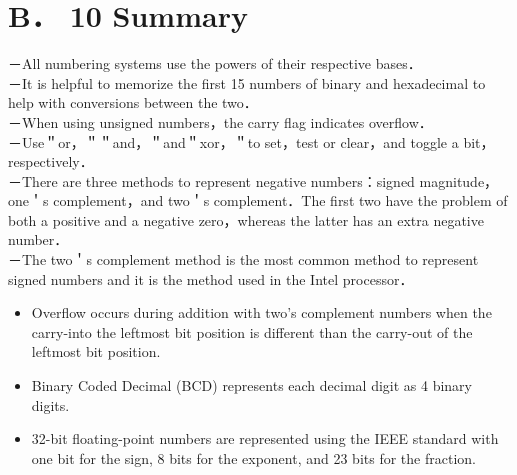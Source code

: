 \documentclass[10pt]{article}
\begin{document}
\section*{B． 10 Summary}
－All numbering systems use the powers of their respective bases．\\
－It is helpful to memorize the first 15 numbers of binary and hexadecimal to help with conversions between the two．\\
－When using unsigned numbers，the carry flag indicates overflow．\\
－Use＂or，＂＂and，＂and＂xor，＂to set，test or clear，and toggle a bit，respectively．\\
－There are three methods to represent negative numbers：signed magnitude，one＇s complement，and two＇s complement．The first two have the problem of both a positive and a negative zero，whereas the latter has an extra negative number．\\
－The two＇s complement method is the most common method to represent signed numbers and it is the method used in the Intel processor．

\begin{itemize}
  \item Overflow occurs during addition with two's complement numbers when the carry-into the leftmost bit position is different than the carry-out of the leftmost bit position.
  \item Binary Coded Decimal (BCD) represents each decimal digit as 4 binary digits.
  \item 32-bit floating-point numbers are represented using the IEEE standard with one bit for the sign, 8 bits for the exponent, and 23 bits for the fraction.
\end{itemize}
\end{document}
